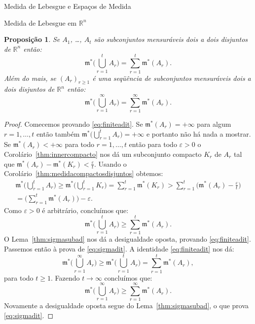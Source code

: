 \documentclass[oneside,final,11pt]{amsbook}
\newcommand{\R}{\mathds R}
\newcommand{\leb}{\mathfrak m}
\theoremstyle{remark}\newtheorem{exercise}{Exercício}[chapter]
\theoremstyle{remark}\newtheorem{*exercise}[exercise]{\hbox to 0pt{\hskip 0pt minus 1fil*}Exercício}
\theoremstyle{definition}\newtheorem{exdefin}{Definição}[chapter]
\theoremstyle{plain}\newtheorem{teo}{Teorema}[section]
\theoremstyle{plain}\newtheorem{lem}[teo]{Lema}
\theoremstyle{plain}\newtheorem{prop}[teo]{Proposição}
\theoremstyle{plain}\newtheorem{cor}[teo]{Corolário}
\theoremstyle{definition}\newtheorem{defin}[teo]{Definição}
\theoremstyle{remark}\newtheorem{rem}[teo]{Observação}
\theoremstyle{definition}\newtheorem{notation}[teo]{Notação}
\theoremstyle{definition}\newtheorem{convention}[teo]{Convenção}
\theoremstyle{definition}\newtheorem{example}[teo]{Exemplo}
\numberwithin{section}{chapter}
\numberwithin{equation}{section}
\begin{document}
\begin{chapter}{Medida de Lebesgue e Espaços de Medida}
\begin{section}[Medida de Lebesgue em $\R^n$]{Medida de Lebesgue em ${\R^n}$}
\begin{prop}\label{thm:sigmaditiva}
Se $A_1$, \dots, $A_t$ são subconjuntos mensuráveis dois a dois disjuntos de $\R^n$ então:
\begin{equation}\label{eq:finiteadit}
\leb^*\Big(\bigcup_{r=1}^tA_r\Big)=\sum_{r=1}^t\leb^*(A_r).
\end{equation}
Além do mais, se $(A_r)_{r\ge1}$ é uma seqüência de subconjuntos mensuráveis dois a dois
disjuntos de $\R^n$ então:
\begin{equation}\label{eq:sigmadit}
\leb^*\Big(\bigcup_{r=1}^\infty A_r\Big)=\sum_{r=1}^\infty\leb^*(A_r).
\end{equation}
\end{prop}
\begin{proof}
Comecemos provando \eqref{eq:finiteadit}. Se $\leb^*(A_r)=+\infty$ para algum $r=1,\ldots,t$
então também $\leb^*\big(\bigcup_{r=1}^tA_r\big)=+\infty$
e portanto não há nada a mostrar. Se $\leb^*(A_r)<+\infty$ para todo $r=1,\ldots,t$
então para todo $\varepsilon>0$ o Corolário~\ref{thm:innercompacto} nos dá um subconjunto compacto
$K_r$ de $A_r$ tal que $\leb^*(A_r)-\leb^*(K_r)<\frac\varepsilon t$. Usando o Corolário~\ref{thm:medidacompactosdisjuntos} obtemos:
\begin{multline*}
\leb^*\Big(\bigcup_{r=1}^tA_r\Big)\ge\leb^*\Big(\bigcup_{r=1}^tK_r\Big)=\sum_{r=1}^t\leb^*(K_r)>
\sum_{r=1}^t\big(\leb^*(A_r)-\tfrac\varepsilon t\big)\\
=\Big(\sum_{r=1}^t\leb^*(A_r)\Big)-\varepsilon.
\end{multline*}
Como $\varepsilon>0$ é arbitrário, concluímos que:
\[\leb^*\Big(\bigcup_{r=1}^tA_r\Big)\ge\sum_{r=1}^t\leb^*(A_r).\]
O Lema~\ref{thm:sigmasubad} nos dá a desigualdade oposta, provando \eqref{eq:finiteadit}.
Passemos então à prova de \eqref{eq:sigmadit}. A identidade \eqref{eq:finiteadit} nos dá:
\[\leb^*\Big(\bigcup_{r=1}^\infty A_r\Big)\ge\leb^*\Big(\bigcup_{r=1}^tA_r\Big)=\sum_{r=1}^t\leb^*(A_r),\]
para todo $t\ge1$. Fazendo $t\to\infty$ concluímos que:
\[\leb^*\Big(\bigcup_{r=1}^\infty A_r\Big)\ge\sum_{r=1}^\infty\leb^*(A_r).\]
Novamente a desigualdade oposta segue do Lema~\ref{thm:sigmasubad}, o que prova \eqref{eq:sigmadit}.
\end{proof}


\end{section}
\end{chapter}
\end{document}
